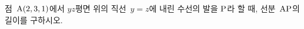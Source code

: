 점~$\mathrm{A}(2{,}\mkern3mu\mathopen{}3{,}\mkern3mu\mathopen{}1)$에서 $yz$평면 위의 직선~$y=z$에 내린 수선의 발을 $\mathrm{P}$라 할 때, 선분~$\mathrm{AP}$의 길이를 구하시오.

